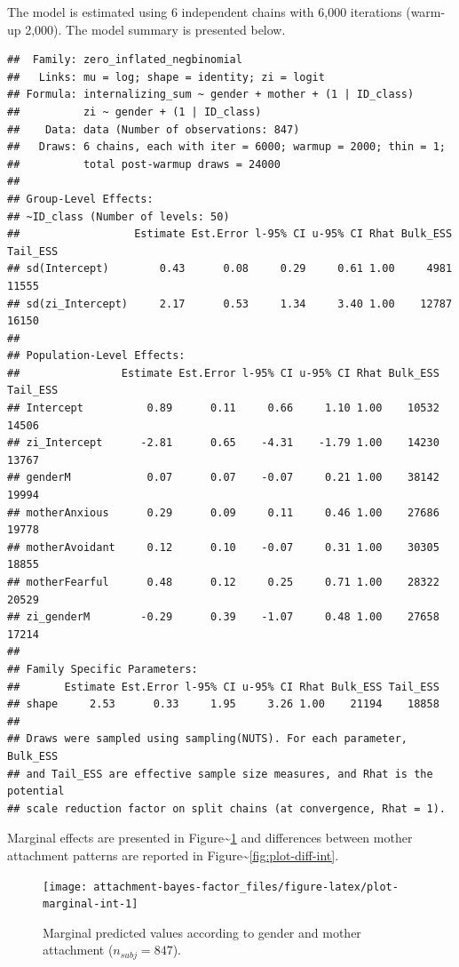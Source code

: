 \documentclass[
]{book}
\begin{document}
The model is estimated using 6 independent chains with 6,000 iterations (warm-up 2,000). The model summary is presented below.

\begin{verbatim}
##  Family: zero_inflated_negbinomial 
##   Links: mu = log; shape = identity; zi = logit 
## Formula: internalizing_sum ~ gender + mother + (1 | ID_class) 
##          zi ~ gender + (1 | ID_class)
##    Data: data (Number of observations: 847) 
##   Draws: 6 chains, each with iter = 6000; warmup = 2000; thin = 1;
##          total post-warmup draws = 24000
## 
## Group-Level Effects: 
## ~ID_class (Number of levels: 50) 
##                  Estimate Est.Error l-95% CI u-95% CI Rhat Bulk_ESS Tail_ESS
## sd(Intercept)        0.43      0.08     0.29     0.61 1.00     4981    11555
## sd(zi_Intercept)     2.17      0.53     1.34     3.40 1.00    12787    16150
## 
## Population-Level Effects: 
##                Estimate Est.Error l-95% CI u-95% CI Rhat Bulk_ESS Tail_ESS
## Intercept          0.89      0.11     0.66     1.10 1.00    10532    14506
## zi_Intercept      -2.81      0.65    -4.31    -1.79 1.00    14230    13767
## genderM            0.07      0.07    -0.07     0.21 1.00    38142    19994
## motherAnxious      0.29      0.09     0.11     0.46 1.00    27686    19778
## motherAvoidant     0.12      0.10    -0.07     0.31 1.00    30305    18855
## motherFearful      0.48      0.12     0.25     0.71 1.00    28322    20529
## zi_genderM        -0.29      0.39    -1.07     0.48 1.00    27658    17214
## 
## Family Specific Parameters: 
##       Estimate Est.Error l-95% CI u-95% CI Rhat Bulk_ESS Tail_ESS
## shape     2.53      0.33     1.95     3.26 1.00    21194    18858
## 
## Draws were sampled using sampling(NUTS). For each parameter, Bulk_ESS
## and Tail_ESS are effective sample size measures, and Rhat is the potential
## scale reduction factor on split chains (at convergence, Rhat = 1).
\end{verbatim}

Marginal effects are presented in Figure\textasciitilde\ref{fig:plot-marginal-int} and differences between mother attachment patterns are reported in Figure\textasciitilde\ref{fig:plot-diff-int}.

\begin{figure}

{\centering \texttt{[image: attachment-bayes-factor\_files/figure-latex/plot-marginal-int-1]} 

}

\caption{Marginal predicted values according to gender and mother attachment ($n_{subj} = 847$).}\label{fig:plot-marginal-int}
\end{figure}
\end{document}
